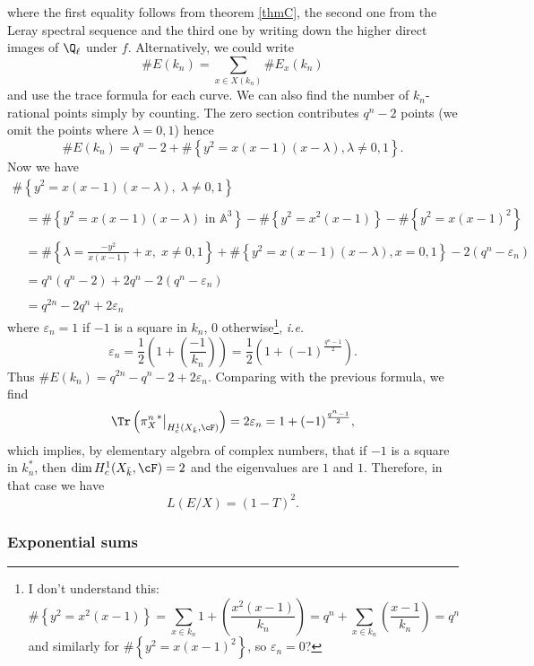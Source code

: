 where the first equality follows from theorem \ref{thmC}, the second one from the Leray spectral sequence and the third one by writing down the higher direct images of $\Q_\ell$ under $f$. Alternatively, we could write 
$$
\#E(k_n) = \sum_{x \in X(k_n)} \#E_x(k_n)
$$
and use the trace formula for each curve. We can also find the number of $k_n$-rational points simply by counting. The zero section contributes $q^n -2$ points (we omit the points where $\lambda = 0, 1$) hence
$$
\# E(k_n) =  q^n-2 + \#\left\{y^2 = x(x-1)(x-\lambda), \lambda\neq 0, 1\right\}.
$$
Now we have
$$
\begin{array}{l}
 \#\left\{y^2 = x(x-1)(x-\lambda), \; \lambda\neq 0, 1\right\}\\
 \\
 \quad =  \#\left\{y^2 = x(x-1)(x-\lambda)\text{ in }\mathbb A^3\right\} -\#\left\{y^2 = x^2(x-1)\right\}-\#\left\{y^2 = x(x-1)^2\right\}\\
 \\
 \quad =  \#\left\{\lambda=\frac{-y^2}{x(x-1)}+x, \; x\neq 0, 1\right\} + \#\left\{y^2 = x(x-1)(x-\lambda), x=0, 1\right\}-2(q^n-\varepsilon_n) \\
 \\
 \quad =  q^n(q^n-2)+2q^n-2(q^n-\varepsilon_n)\\
 \\
 \quad =  q^{2n}-2q^n+2\varepsilon_n
\end{array}
$$
where $\varepsilon_n = 1$ if $-1$ is a square in $k_n$, 0 otherwise\footnote{I don't understand this: 
 $$
\#\left\{y^2 = x^2(x-1)\right\} = \sum_{x \in k_n} 1+\left(\frac{x^2(x-1)}{k_n}\right) = q^n+\sum_{x \in k_n} \left(\frac{x-1}{k_n}\right) = q^n
 $$
and similarly for $\#\left\{y^2 = x(x-1)^2\right\}$, so $\varepsilon_n = 0$?}, {\it i.e.} 
$$
\varepsilon_n = \frac{1}{2}\left(1+\left(\frac{-1}{k_n}\right)\right) = \frac{1}{2}\left(1+(-1)^{\frac{q^n-1}{2}}\right).
$$
Thus $ \# E(k_n) =  q^{2n}-q^n-2+ 2\varepsilon_n$. Comparing with the previous formula, we find
$$
\Tr\left({\pi_X^n}^*\big|_{H_c^1(X_{\bar k}, \cF)}\right) = 2 \varepsilon_n =  1+(-1)^{\frac{q^n-1}{2}},
$$
which implies, by elementary algebra of complex numbers, that if $-1$ is a square in $k_n^*$, then $\dim H_c^1(X_{\bar k}, \cF) = 2$ and the eigenvalues are $1$ and $1$. Therefore, in that case we have
 $$L(E/X) = (1-T)^2.$$

\subsubsection*{Exponential sums}

